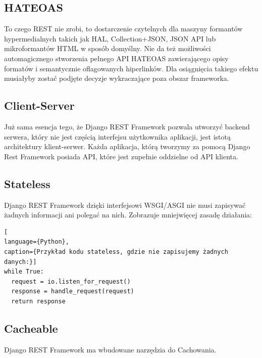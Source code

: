 \documentclass[oneside,polski,logo,indent]{amuthesis}
\begin{document}
\begin{center}
\subsection{HATEOAS}
\end{center}
To czego REST nie zrobi, to dostarczenie czytelnych dla maszyny formantów hypermedialnych takich jak HAL, Collection+JSON, JSON API lub mikroformantów HTML w sposób domyślny. Nie da też możliwości automagicznego stworzenia pełnego API HATEOAS zawierającego opisy formatów i semantycznie oflagowanych hiperlinków. Dla osiągnięcia takiego efektu musiałyby zostać podjęte decyzje wykraczające poza obszar frameworka. 


\begin{center}
\subsection{Client-Server}
\end{center}
Już sama esencja tego, że Django REST Framework pozwala utworzyć backend serwera, który nie jest częścią interfejsu użytkownika aplikacji, jest istotą architektury klient-serwer. Każda aplikacja, którą tworzymy za pomocą Django Rest Framework posiada API, które jest zupełnie oddzielne od API klienta. 

\begin{center}
\subsection{Stateless}
\end{center}
Django REST Framework dzięki interfejsowi WSGI/ASGI nie musi zapisywać żadnych informacji ani polegać na nich. Zobrazuje mniejwięcej zasadę działania:


\begin{lstlisting}[
language={Python},
caption={Przykład kodu stateless, gdzie nie zapisujemy żadnych danych:}]
while True:
  request = io.listen_for_request()
  response = handle_request(request)
  return response
\end{lstlisting}

\begin{center}
\subsection{Cacheable}
\end{center}
Django REST Framework ma wbudowane narzędzia do Cachowania.
\end{document}
